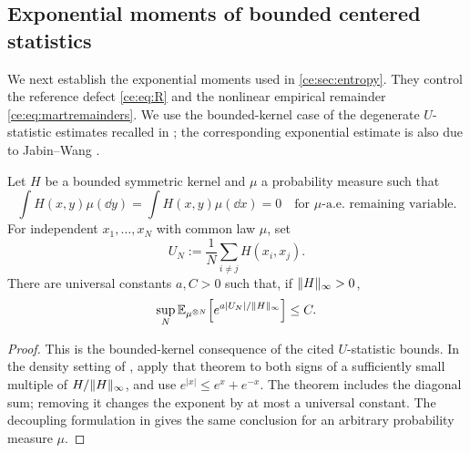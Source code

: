 \documentclass[11pt,reqno]{amsart}
\numberwithin{equation}{section}
\theoremstyle{plain}
\theoremstyle{remark}
\DeclarePairedDelimiter{\norm}{\lVert}{\rVert}
\newcommand{\E}{\mathbb E}\newcommand{\Q}{\mathbb Q}\newcommand{\Pb}{\mathbb P}
\begin{document}
\subsection{Exponential moments of bounded centered statistics}\label{ce:sec:bounded-statistics}

We next establish the exponential moments used in \cref{ce:sec:entropy}. They control the reference defect \eqref{ce:eq:R} and the nonlinear empirical remainder \eqref{ce:eq:martremainders}. We use the bounded-kernel case of the degenerate $U$-statistic estimates recalled in \cite[Propositions~3.1 and~3.3]{DGRpartition}; the corresponding exponential estimate is also due to Jabin--Wang \cite[Theorem~4]{JabinWang2018}.

\begin{lemma}\label{ce:lem:Ustat}
Let $H$ be a bounded symmetric kernel and $\mu$ a probability measure such that
\begin{equation}\label{ce:eq:U-centering}
 \int H(x,y)\mu(\dd y)=\int H(x,y)\mu(\dd x)=0
 \quad\text{for $\mu$-a.e. remaining variable}.
\end{equation}
For independent $x_1,\ldots,x_N$ with common law $\mu$, set
\begin{equation}\label{ce:eq:UN}
 U_N:=\frac1N\sum_{i\ne j}H(x_i,x_j).
\end{equation}
There are universal constants $a,C>0$ such that, if $\norm H_\infty>0$,
\begin{equation}\label{ce:eq:Uexp}
 \sup_N\E_{\mu^{\otimes N}}\!\left[e^{a|U_N|/\norm H_\infty}\right]\le C.
\end{equation}
\end{lemma}
\begin{proof}
This is the bounded-kernel consequence of the cited $U$-statistic bounds. In the density setting of \cite[Theorem~4]{JabinWang2018}, apply that theorem to both signs of a sufficiently small multiple of $H/\norm H_\infty$, and use $e^{|x|}\le e^x+e^{-x}$. The theorem includes the diagonal sum; removing it changes the exponent by at most a universal constant. The decoupling formulation in \cite[Propositions~3.1 and~3.3]{DGRpartition} gives the same conclusion for an arbitrary probability measure $\mu$.
\end{proof}
\end{document}
